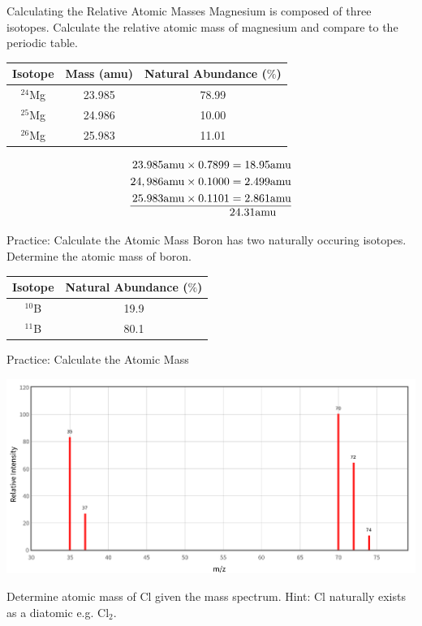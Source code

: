 \documentclass[11pt]{beamer}
\begin{document}
\begin{frame}{Calculating the Relative Atomic Masses}
  Magnesium is composed of three isotopes. Calculate the
  relative atomic mass of magnesium and compare to the periodic
  table.
  \begin{center}
  \begin{tabular}{ccc}
    Isotope & Mass (amu) & Natural Abundance ($\%$) \\
    \hline
    $^{24}$Mg & 23.985 & 78.99 \\
    $^{25}$Mg & 24.986 & 10.00 \\
    $^{26}$Mg & 25.983 & 11.01
  \end{tabular}
  \end{center}

  \begin{align*}
    23.985\text{amu}\times 0.7899 & =  18.95 \text{amu} \\
    24,986\text{amu}\times 0.1000 & =  2.499 \text{amu} \\
    25.983\text{amu}\times 0.1101 & =  2.861 \text{amu} \\
    \hline
    &   24.31 \text{amu}
  \end{align*}
\end{frame}

\begin{frame}{Practice: Calculate the Atomic Mass}
  Boron has two naturally occuring isotopes. Determine the
  atomic mass of boron.
  
  \begin{center}
  \begin{tabular}{cc}
    Isotope & Natural Abundance ($\%$) \\
    \hline
    $^{10}$B & 19.9 \\
    $^{11}$B & 80.1 
  \end{tabular}
  \end{center}
\end{frame}

\begin{frame}{Practice: Calculate the Atomic Mass}
  \begin{center}
    \includegraphics[scale=0.175]{cl_mass_spec}
  \end{center}
  Determine atomic mass of Cl given the mass spectrum. Hint:
  Cl naturally exists as a diatomic e.g. Cl$_2$.
\end{frame}
\end{document}
